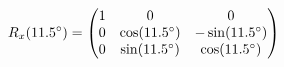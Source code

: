 \documentclass[preview]{standalone}
\begin{document}
\begin{align*}
\special{dvisvgm:raw <g id='unique000'>}R_x(11.5^\circ) = \begin{pmatrix} 1 & 0 & 0 \\ 0 & \cos(11.5^\circ) & -\sin(11.5^\circ) \\ 0 & \sin(11.5^\circ) & \cos(11.5^\circ) \end{pmatrix}\special{dvisvgm:raw </g>}
\end{align*}
\end{document}
